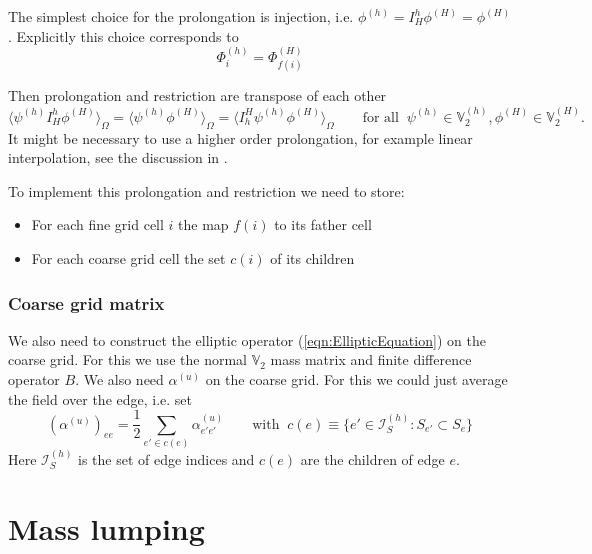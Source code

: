 \documentclass[12pt]{article}
\newcommand{\intOmega}[1]{\langle#1\rangle_{\Omega}}
\newcommand{\Vpressure}{\mathbb{V}_2}
\newcommand{\indexSet}{\mathcal{I}}
\begin{document}
The simplest choice for the prolongation is injection, i.e. $\phi^{(h)} = I_H^h \phi^{(H)} = \phi^{(H)}$. Explicitly this choice corresponds to
\begin{equation}
  \Phi^{(h)}_i = \Phi^{(H)}_{f(i)}
\end{equation}

Then prolongation and restriction are transpose of each other
\begin{equation}
  \intOmega{\psi^{(h)}I_H^h \phi^{(H)}} = \intOmega{\psi^{(h)}\phi^{(H)}} = \intOmega{I_h^H \psi^{(h)}\phi^{(H)}} \qquad\text{for all}\;\; \psi^{(h)}\in \Vpressure^{(h)}, \phi^{(H)} \in\Vpressure^{(H)}.
\end{equation}
It might be necessary to use a higher order prolongation, for example linear interpolation, see the discussion in \cite{Hemker1990}.

To implement this prolongation and restriction we need to store:
\begin{itemize}
  \item For each fine grid cell $i$ the map $f(i)$ to its father cell
  \item For each coarse grid cell the set $c(i)$ of its children
\end{itemize}
\subsubsection{Coarse grid matrix}
We also need to construct the elliptic operator (\ref{eqn:EllipticEquation}) on the coarse grid. For this we use the normal $\Vpressure$ mass matrix and finite difference operator $B$. We also need $\alpha^{(u)}$ on the coarse grid. For this we could just average the field over the edge, i.e. set
\begin{equation}
  \left(\alpha^{(u)}\right)_{ee} = \frac{1}{2} \sum_{e'\in c(e)}\alpha^{(u)}_{e'e'} \qquad\text{with}\;\;c(e) \equiv \{e'\in \indexSet_S^{(h)}:S_{e'}\subset S_{e}\}
\end{equation}
Here $\indexSet_S^{(h)}$ is the set of edge indices and $c(e)$ are the children of edge $e$.
\appendix
\section{Mass lumping}\label{sec:MassLumping}
\end{document}
